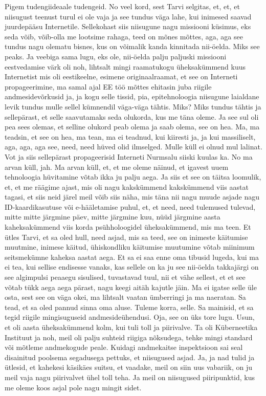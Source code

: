 Pigem tudengiideaale tudengeid. No veel kord, sest Tarvi selgitas, et, et, et niisugust teenust turul ei ole vaja ja see tundus väga lahe, kui inimesed saavad juurdepääsu Internetile. Sellekohast siis niisugune nagu missiooni küsimus, eks seda võib, võib-olla me lootsime rahaga, teed on mõnes mõttes, aga, aga see tundus nagu olematu bisnes, kus on võimalik kanda kinnitada nii-öelda. Miks see peaks. Ja veebiga sama lugu, eks ole, nii-öelda palju paljuski missiooni eestvedamise värk oli noh, lihtsalt mingi raamatukogu üheksakümmend kuus Internetist mis oli eestikeelne, esimene originaalraamat, et see on Interneti propageerimine, ma samal ajal EE töö mõttes ehitasin juba riigile andmesidevõrkusid ja, ja kogu selle tissid, pia, epitehnoloogia niisugune laialdane levik tundus mulle sellel kümnendil väga-väga tähtis.
Miks?
Miks tundus tähtis ja sellepärast, et selle saavutamaks seda olukorda, kus me täna oleme. Ja see sul oli pea sees olemas, et selline olukord peab olema ja saab olema, see on hea. Ma, ma teadsin, et see on hea, ma tean, ma ei teadnud, kui kiiresti ja, ja kui massiliselt, aga, aga, aga see, need, need hüved olid ilmselged. Mulle küll ei olnud mul lalinat.
Vot ja siis sellepärast propageerisid Interneti Nurmsalu siiski kuulas ka. No ma arvan küll, jah. Ma arvan küll, et, et me oleme näinud, et igavest uuem tehnoloogia hüvitamine võtab ikka ju palju aega. Ja siis et see on täitsa loomulik, et, et me räägime ajast, mis oli nagu kakskümmend kakskümmend viis aastat tagasi, et siis neid järel meil võib siis näha, mis täna nii nagu muude asjade nagu ID-kaardikasutuse või e-hääletamise puhul, et, et need, need tulemused tulevad, mitte mitte järgmine päev, mitte järgmine kuu, nüüd järgmine aasta kaheksakümmend viis korda psühholoogidel üheksakümmend, mis ma teen. Et ütles Tarvi, et sa oled hull, need asjad, mis sa teed, see on inimeste käitumise muutmine, inimese käitud, ühiskondliku käitumise muutumine võtab miinimum seitsmekümne kaheksa aastat aega. Et sa ei saa enne oma tibusid lugeda, kui ma ei tea, kui sellise endisesse vanaks, kas sellele on ka ju see nii-öelda takkajärgi on see algimpulsi peaaegu sisulised, tuvastavad tuul, nii et vähe sellest, et et see võtab tükk aega aega pärast, nagu keegi aitäh kajutle jäin. Ma ei igatse selle üle osta, sest see on väga okei, ma lihtsalt vaatan ümberringi ja ma naeratan. Sa tead, et sa oled pannud sinna oma aluse.
Tuleme korra, selle. Sa mainisid, et sa tegid riigile mingisuguseid andmesideühendusi. Oja, see on üks tore lugu.
Usun, et oli aasta üheksakümmend kolm, kui tuli toll ja piirivalve. Ta oli Küberneetika Instituut ja noh, meil oli palju suhteid riigiga nõksudega, tehke mingi standard või mõtleme andmekogude peale. Kuidagi andmekaitse inspektsioon sai seal disainitud poolsema segadusega pettuks, et niisugused asjad. Ja, ja nad tulid ja ütlesid, et kahekesi käsikäes suitsu, et vaadake, meil on siin uus vabariik, on ju meil vaja nagu piirivalvet ühel toll teha. Ja meil on niisugused piiripunktid, kus me oleme koos asjal pole nagu mingit sidet.
